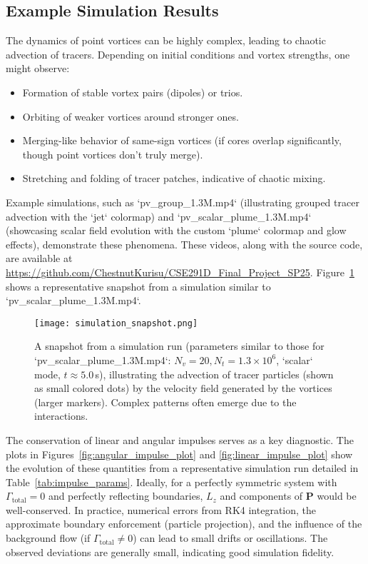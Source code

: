 \documentclass[12pt,letterpaper]{article}
\newcommand{\vortstrength}{\Gamma}
\begin{document}
\subsection{Example Simulation Results}
The dynamics of point vortices can be highly complex, leading to chaotic advection of tracers. Depending on initial conditions and vortex strengths, one might observe:
\begin{itemize}
    \item Formation of stable vortex pairs (dipoles) or trios.
    \item Orbiting of weaker vortices around stronger ones.
    \item Merging-like behavior of same-sign vortices (if cores overlap significantly, though point vortices don't truly merge).
    \item Stretching and folding of tracer patches, indicative of chaotic mixing.
\end{itemize}
Example simulations, such as `pv\_group\_1.3M.mp4` (illustrating grouped tracer advection with the `jet` colormap) and `pv\_scalar\_plume\_1.3M.mp4` (showcasing scalar field evolution with the custom `plume` colormap and glow effects), demonstrate these phenomena. These videos, along with the source code, are available at \url{https://github.com/ChestnutKurisu/CSE291D_Final_Project_SP25}. Figure~\ref{fig:simulation_snapshot} shows a representative snapshot from a simulation similar to `pv\_scalar\_plume\_1.3M.mp4`.

\begin{figure}[H]
    \centering
    \texttt{[image: simulation\_snapshot.png]} 
    \caption{A snapshot from a simulation run (parameters similar to those for `pv\_scalar\_plume\_1.3M.mp4`: $N_v=20, N_t=1.3 \times 10^6$, `scalar` mode, $t \approx 5.0$\,s), illustrating the advection of tracer particles (shown as small colored dots) by the velocity field generated by the vortices (larger markers). Complex patterns often emerge due to the interactions.}
    \label{fig:simulation_snapshot}
\end{figure}

The conservation of linear and angular impulses serves as a key diagnostic. The plots in Figures~\ref{fig:angular_impulse_plot} and \ref{fig:linear_impulse_plot} show the evolution of these quantities from a representative simulation run detailed in Table~\ref{tab:impulse_params}.
Ideally, for a perfectly symmetric system with $\vortstrength_{\text{total}}=0$ and perfectly reflecting boundaries, $L_z$ and components of $\bm{P}$ would be well-conserved. In practice, numerical errors from RK4 integration, the approximate boundary enforcement (particle projection), and the influence of the background flow (if $\vortstrength_{\text{total}} \neq 0$) can lead to small drifts or oscillations. The observed deviations are generally small, indicating good simulation fidelity.
\end{document}
